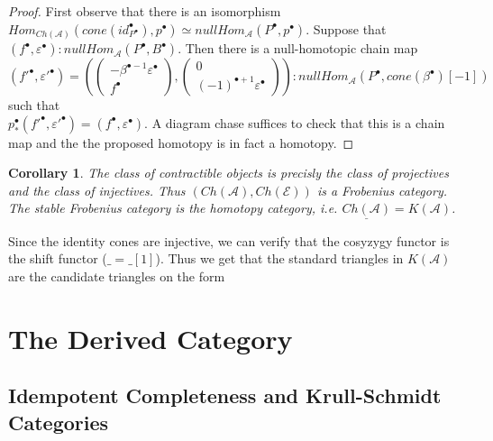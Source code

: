 \documentclass[11pt]{article}
\newtheorem{corollary}{Corollary}[theorem]
\theoremstyle{definition}
\theoremstyle{remark}
\newcommand{\upside}[1]{\rotatebox[origin=c]{180}{#1}}
\newcommand{\chain}[1]{#1^{\bullet}}
\begin{document}
\begin{proof}
                First observe that there is an isomorphism $Hom_{Ch(\mathcal{A})}(cone(\chain{id_{\chain{P}}}),\chain{p})\simeq nullHom_{\mathcal{A}}(\chain{P},\chain{p})$. Suppose that $(\chain{f},\chain{\varepsilon}):nullHom_{\mathcal{A}}(\chain{P},\chain{B})$. Then there is a null-homotopic chain map $(\chain{f'},\chain{\varepsilon '})=(\begin{pmatrix} -\beta^{\bullet - 1}\chain{\varepsilon} \\ \chain{f} \end{pmatrix}, \begin{pmatrix} 0 \\ (-1)^{\bullet + 1}\chain{\varepsilon} \end{pmatrix}):nullHom_{\mathcal{A}}(\chain{P},cone(\chain{\beta})[-1])$ such that \\$\chain{p}_*(\chain{f'},\chain{\varepsilon '})=(\chain{f},\chain{\varepsilon})$. A diagram chase suffices to check that this is a chain map and the the proposed homotopy is in fact a homotopy.
            \end{proof}

            \begin{corollary}
                The class of contractible objects is precisly the class of projectives and the class of injectives. Thus $(Ch(\mathcal{A}),Ch(\mathcal{E}))$ is a Frobenius category. The stable Frobenius category is the homotopy category, i.e. $\underline{Ch(\mathcal{A})}=K(\mathcal{A})$. 
            \end{corollary}

            Since the identity cones are injective, we can verify that the cosyzygy functor is the shift functor (\upside{$\Omega$}$\_=\_[1]$). Thus we get that the standard triangles in $K(\mathcal{A})$ are the candidate triangles on the form
            \begin{center}
            \end{center}

    \clearpage
    
    \section{The Derived Category}

        \subsection{Idempotent Completeness and Krull-Schmidt Categories}
\end{document}
